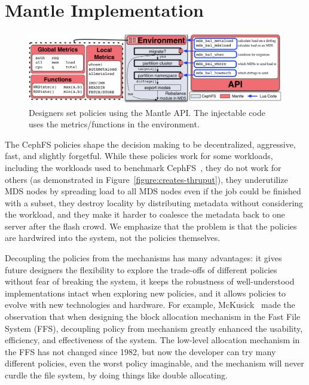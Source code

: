 \section{Mantle Implementation} 						%
\label{mantle-implementation}							%
\begin{figure}
	\centering
	\includegraphics[width=1\textwidth]{./chapters/mantle/balancer-api.pdf} 
	\caption{Designers set policies using the Mantle API. The injectable code uses the metrics/functions in the environment. \label{figure:balancer-api}}  
\end{figure}

The CephFS policies shape the decision making to be decentralized, aggressive, fast, and slightly forgetful. While these policies work for some workloads, including the workloads used to benchmark CephFS~\cite{weil:sc2004-dyn-metadata}, they do not work for others (as demonstrated in Figure~\ref{figure:creates-thruput}), they underutilize MDS nodes by spreading load to all MDS nodes even if the job could be finished with a subset, they destroy locality by distributing metadata without considering the workload, and they make it harder to coalesce the metadata back to one server after the flash crowd. We emphasize that the problem is that the policies are hardwired into the system, not the policies themselves. 

Decoupling the policies from the mechanisms has many advantages: it gives future designers the flexibility to explore the trade-offs of different policies without fear of breaking the system, it keeps the robustness of well-understood implementations intact when exploring new policies, and it allows policies to evolve with new technologies and hardware. For example, McKusick~\cite{mckusick:fast2015-FFS} made the observation that when designing the block allocation mechanism in the Fast File System (FFS), decoupling policy from mechanism greatly enhanced the usability, efficiency, and effectiveness of the system. The low-level allocation mechanism in the FFS has not changed since 1982, but now the developer can try many different policies, even the worst policy imaginable, and the mechanism will never curdle the file system, by doing things like double allocating. 

